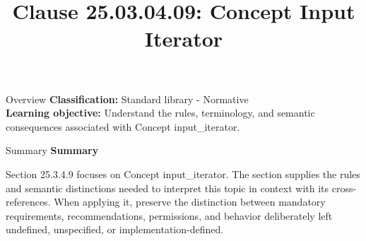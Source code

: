 \documentclass[10pt,letterpaper]{article}
\title{Clause 25.03.04.09: Concept Input Iterator}
\author{}
\date{}
\begin{document}
\maketitle
\begin{CornellOverviewBox}{Overview}
\textbf{Classification:} Standard library - Normative\\[2pt]
\textbf{Learning objective:} Understand the rules, terminology, and semantic consequences associated with Concept input\_iterator.
\end{CornellOverviewBox}\begin{CornellSummaryBox}{Summary}
{\sffamily\bfseries\color{Accent} Summary}\par\vspace{3pt}Section 25.3.4.9 focuses on Concept input\_iterator. The section supplies the rules and semantic distinctions needed to interpret this topic in context with its cross-references. When applying it, preserve the distinction between mandatory requirements, recommendations, permissions, and behavior deliberately left undefined, unspecified, or implementation-defined.
\end{CornellSummaryBox}
\end{document}
